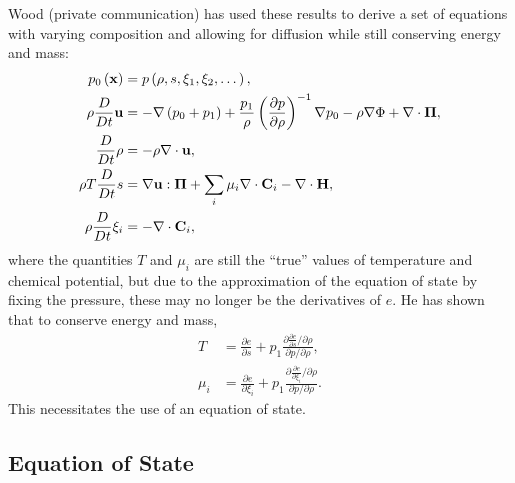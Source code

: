 Wood (private communication) has used these results to derive a set of equations with varying composition and allowing for diffusion while still conserving energy and mass:
\begin{subequations}
	\begin{align}
		\label{eq:pieos}
		p_{0}\left(\mathbf{x}\right)&=p\left(\rho,s,\xi_{1},\xi_{2},\dots\right),\\
		\label{eq:pivelocity}
		\rho\frac{D}{Dt}\mathbf{u}&=-\nabla\left(p_{0}+p_{1}\right)+\frac{p_{1}}{\rho}\left(\frac{\partial p}{\partial \rho}\right)^{-1}\nabla p_{0}-\rho\nabla\Phi+\nabla\cdot\mathbf{\Pi},\\
		\label{eq:pidensity}
		\frac{D}{Dt}\rho&=-\rho\nabla\cdot\mathbf{u},\\
		\label{eq:pientropy}
		\rho T \frac{D}{Dt}s&=\nabla\mathbf{u}:\mathbf{\Pi}+\sum_{i}\mu_{i}\nabla\cdot\mathbf{C}_{i}-\nabla\cdot{\mathbf{H}},\\
		\label{eq:picomposition}
		\rho\frac{D}{Dt}\xi_{i}&=-\nabla\cdot\mathbf{C}_{i},
	\end{align}
\end{subequations}
where the quantities $T$ and $\mu_{i}$ are still the ``true'' values of temperature and chemical potential, but due to the approximation of the equation of state by fixing the pressure, these may no longer be the derivatives of $e$.
He has shown that to conserve energy and mass,
\begin{subequations}
	\begin{align}
		T&=\frac{\partial e}{\partial s}+p_{1}\frac{\partial \frac{\partial e}{\partial s}/\partial\rho}{\partial p/\partial\rho},\\
		\mu_{i}&=\frac{\partial e}{\partial \xi_{i}}+p_{1}\frac{\partial \frac{\partial e}{\partial \xi_{i}}/\partial\rho}{\partial p/\partial\rho}.
	\end{align}
\end{subequations}
This necessitates the use of an equation of state.

\subsection{Equation of State} %
\label{sub:eos}

